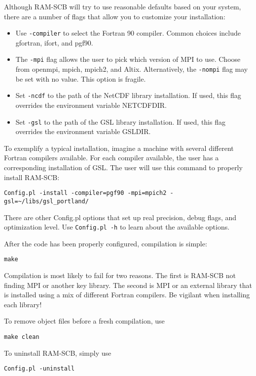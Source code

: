 Although RAM-SCB will try to use reasonable defaults based on your system, there are a number of flags that allow you to customize your installation:
\begin{itemize}
\item{Use {\tt -compiler} to select the Fortran 90 compiler. Common choices include gfortran, ifort, and pgf90.}
\item{The {\tt -mpi} flag allows the user to pick which version of MPI to use. Choose from openmpi, mpich, mpich2, and Altix. Alternatively, the {\tt -nompi} flag may be set with no value. This option is fragile.}
\item{Set {\tt -ncdf} to the path of the NetCDF library installation. If used, this flag overrides the environment variable NETCDFDIR.}
\item{Set {\tt -gsl} to the path of the GSL library installation. If used, this flag overrides the environment variable GSLDIR.}
\end{itemize}

To exemplify a typical installation, imagine a machine with several different Fortran compilers available. For each compiler available, the user has a corresponding installation of GSL. The user will use this command to properly install RAM-SCB:
\begin{verbatim}
Config.pl -install -compiler=pgf90 -mpi=mpich2 -gsl=~/libs/gsl_portland/
\end{verbatim}

There are other Config.pl options that set up real precision, debug flags, and optimization level.  Use {\tt Config.pl -h} to learn about the available options.

After the code has been properly configured, compilation is simple:
\begin{verbatim}
make
\end{verbatim}

Compilation is most likely to fail for two reasons. The first is RAM-SCB not finding MPI or another key library.  The second is MPI or an external library that is installed using a mix of different Fortran compilers. Be vigilant when installing each library!

To remove object files before a fresh compilation, use
\begin{verbatim}
make clean
\end{verbatim}

To uninstall RAM-SCB, simply use
\begin{verbatim}
Config.pl -uninstall
\end{verbatim}


